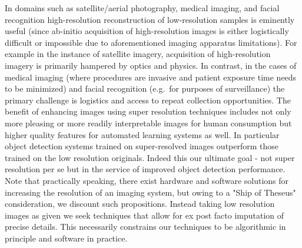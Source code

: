 In domains such as satellite/aerial photography, medical imaging, and facial recognition
high-resolution reconstruction of low-resolution samples is eminently useful (since ab-initio acquisition of
high-resolution images is either logistically difficult or impossible due to aforementioned imaging apparatus limitations).
%
For example in the instance of satellite imagery, acquisition of high-resolution imagery is primarily hampered by optics and physics.
%
In contrast, in the cases of medical imaging (where procedures are invasive and patient exposure time needs to be minimized\cite{doi:10.1002.cmr.a.21249}) and facial recognition (e.g.\ for purposes of surveillance) the primary challenge is logistics and access to repeat collection opportunities.
%
The benefit of enhancing images using super resolution techniques includes not only more pleasing or more readily interpretable images for human consumption but higher quality features for automated learning systems as well.
%
In particular object detection systems trained on super-resolved images outperform those trained on the low
resolution originals\cite{effectssuperres}.
%
Indeed this our ultimate goal - not super resolution per se but in the service of improved object detection performance.
%
Note that practically speaking, there exist hardware and software solutions for increasing the resolution of an imaging
system, but owing to a "Ship of Theseus" consideration, we discount such propositions.
%
Instead taking low resolution images as given we seek techniques that allow for ex post facto imputation of precise details.
%
This necessarily constrains our techniques to be algorithmic in principle and software in practice.

